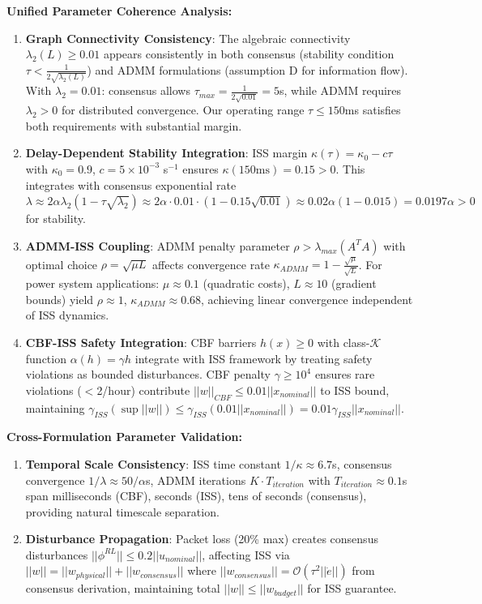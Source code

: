 \documentclass[12pt]{article}
\begin{document}
\textbf{Unified Parameter Coherence Analysis:}
\begin{enumerate}
\item \textbf{Graph Connectivity Consistency}: The algebraic connectivity $\lambda_2(L) \geq 0.01$ appears consistently in both consensus (stability condition $\tau < \frac{1}{2\sqrt{\lambda_2(L)}}$) and ADMM formulations (assumption D for information flow). With $\lambda_2 = 0.01$: consensus allows $\tau_{max} = \frac{1}{2\sqrt{0.01}} = 5$s, while ADMM requires $\lambda_2 > 0$ for distributed convergence. Our operating range $\tau \leq 150$ms satisfies both requirements with substantial margin.
\item \textbf{Delay-Dependent Stability Integration}: ISS margin $\kappa(\tau) = \kappa_0 - c\tau$ with $\kappa_0 = 0.9$, $c = 5 \times 10^{-3}$ s$^{-1}$ ensures $\kappa(150\text{ms}) = 0.15 > 0$. This integrates with consensus exponential rate $\lambda \approx 2\alpha\lambda_2(1-\tau\sqrt{\lambda_2}) \approx 2\alpha \cdot 0.01 \cdot (1-0.15\sqrt{0.01}) \approx 0.02\alpha(1-0.015) = 0.0197\alpha > 0$ for stability.
\item \textbf{ADMM-ISS Coupling}: ADMM penalty parameter $\rho > \lambda_{max}(A^TA)$ with optimal choice $\rho = \sqrt{\mu L}$ affects convergence rate $\kappa_{ADMM} = 1-\frac{\sqrt{\mu}}{\sqrt{L}}$. For power system applications: $\mu \approx 0.1$ (quadratic costs), $L \approx 10$ (gradient bounds) yield $\rho \approx 1$, $\kappa_{ADMM} \approx 0.68$, achieving linear convergence independent of ISS dynamics.
\item \textbf{CBF-ISS Safety Integration}: CBF barriers $h(x) \geq 0$ with class-$\mathcal{K}$ function $\alpha(h) = \gamma h$ integrate with ISS framework by treating safety violations as bounded disturbances. CBF penalty $\gamma \geq 10^4$ ensures rare violations ($<$2/hour) contribute $||w||_{CBF} \leq 0.01||x_{nominal}||$ to ISS bound, maintaining $\gamma_{ISS}(\sup||w||) \leq \gamma_{ISS}(0.01||x_{nominal}||) = 0.01\gamma_{ISS}||x_{nominal}||$.
\end{enumerate}

\textbf{Cross-Formulation Parameter Validation:}
\begin{enumerate}
\item \textbf{Temporal Scale Consistency}: ISS time constant $1/\kappa \approx 6.7$s, consensus convergence $1/\lambda \approx 50/\alpha$s, ADMM iterations $K \cdot T_{iteration}$ with $T_{iteration} \approx 0.1$s span milliseconds (CBF), seconds (ISS), tens of seconds (consensus), providing natural timescale separation.
\item \textbf{Disturbance Propagation}: Packet loss (20\% max) creates consensus disturbances $||\phi^{RL}|| \leq 0.2||u_{nominal}||$, affecting ISS via $||w|| = ||w_{physical}|| + ||w_{consensus}||$ where $||w_{consensus}|| = \mathcal{O}(\tau^2 ||\dot{e}||)$ from consensus derivation, maintaining total $||w|| \leq ||w_{budget}||$ for ISS guarantee.
\end{enumerate}
\end{document}
